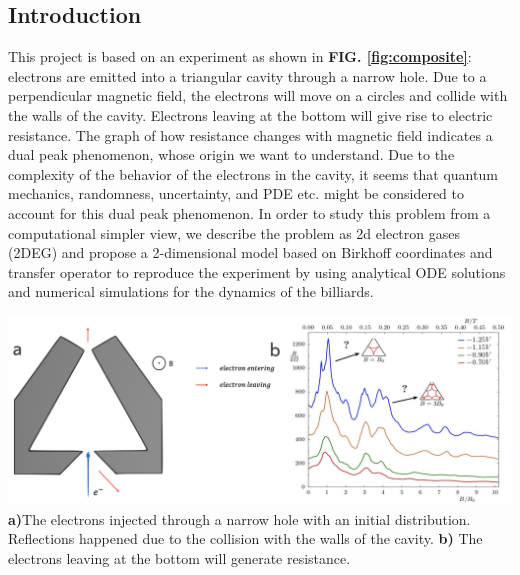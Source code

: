 \documentclass[a0,portrait]{a0poster}
\begin{document}
\begin{multicols}{3} %

\section*{Introduction}
\noindent
This project is based on an experiment \cite{richterklassischer} as shown in \textbf{FIG. \ref{fig:composite}}: electrons \cite{boggild1999magnetic} are emitted into a triangular cavity through a narrow hole. Due to a perpendicular magnetic field, the electrons will move on a circles and collide with the walls of the cavity. Electrons leaving at the bottom will give rise to electric resistance. The graph of how resistance changes with magnetic field indicates a dual peak phenomenon, whose origin we want to understand. Due to the complexity of the behavior of the electrons in the cavity, it seems that quantum mechanics, randomness, uncertainty, and PDE etc. might be considered to account for this dual peak phenomenon. In order to study this problem from a computational simpler view, we describe the problem as 2d electron gases (2DEG) and propose a 2-dimensional model based on Birkhoff coordinates and transfer operator to reproduce the experiment by using analytical ODE solutions and numerical simulations for the dynamics of the billiards.

\begin{center}\vspace{1cm}
    \includegraphics[width=0.7\linewidth]{composite.png}
     \textbf{a)}{The electrons injected through a narrow hole with an initial distribution. Reflections happened due to the collision with the walls of the cavity. \textbf{b)} The electrons leaving at the bottom will generate resistance.}
    \label{fig:composite}
\end{center}%


\end{multicols}
\end{document}
